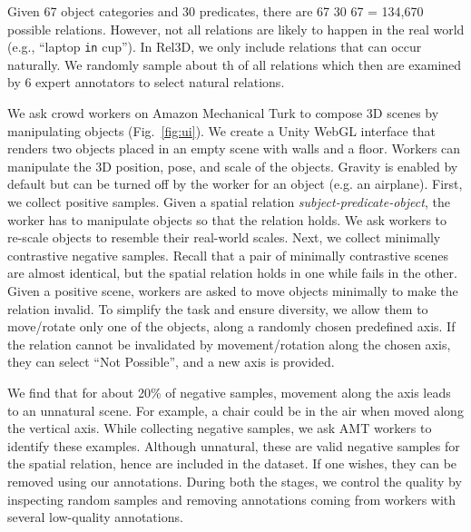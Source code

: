 \documentclass{article}
\newcommand{\smallsec}[1]{\noindent {\bf #1.}}
\newcommand\datasetname{Rel3D}
\newcommand\numobjectcategories{67}
\newcommand\numpredicates{30}
\begin{document}
\smallsec{Relation vocabulary} Given {\numobjectcategories } object categories and {\numpredicates } predicates, there are {\numobjectcategories }  {\numpredicates }  {\numobjectcategories } = 134,670 possible relations. However, not all relations are likely to happen in the real world (e.g., ``laptop \texttt{in} cup''). In \datasetname, we only include relations that can occur naturally. We randomly sample about th of all relations which then are examined by 6 expert annotators to select natural relations.


\smallsec{Crowdsourcing 3D scenes} We ask crowd workers on Amazon Mechanical Turk to compose 3D scenes by manipulating objects (Fig.~\ref{fig:ui}). We create a Unity WebGL interface that renders two objects placed in an empty scene with walls and a floor. Workers can manipulate the 3D position, pose, and scale of the objects. Gravity is enabled by default but can be turned off by the worker for an object (e.g. an airplane).
First, we collect positive samples. Given a spatial relation \emph{subject-predicate-object}, the worker has to manipulate objects so that the relation holds. We ask workers to re-scale objects to resemble their real-world scales.
Next, we collect minimally contrastive negative samples. Recall that a pair of minimally contrastive scenes are almost identical, but the spatial relation holds in one while fails in the other. Given a positive scene, workers are asked to move objects minimally to make the relation invalid. To simplify the task and ensure diversity, we allow them to move/rotate only one of the objects, along a randomly chosen predefined axis. If the relation cannot be invalidated by movement/rotation along the chosen axis, they can select ``Not Possible'', and a new axis is provided. 

 We find that for about 20\% of negative samples, movement along the axis leads to an unnatural scene. For example, a chair could be in the air when moved along the vertical axis. While collecting negative samples, we ask AMT workers to identify these examples. Although unnatural, these are valid negative samples for the spatial relation, hence are included in the dataset. If one wishes, they can be removed using our annotations. During both the stages, we control the quality by inspecting random samples and removing annotations coming from workers with several low-quality annotations.
\end{document}
